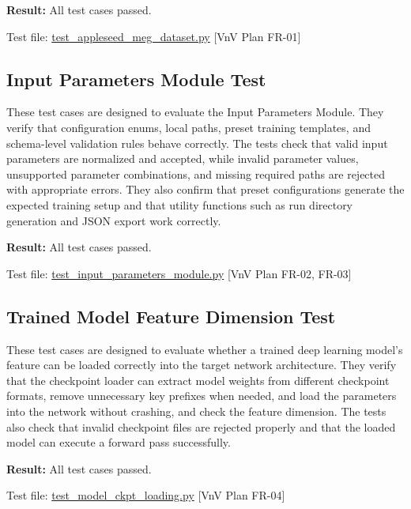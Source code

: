 \documentclass[12pt, titlepage]{article}
\begin{document}
\textbf{Result:} All test cases passed.

Test file: \href{https://github.com/Krozix-2026/cas741-speech-trf/blob/main/src/test/test_appleseed_meg_dataset.py}{test\_appleseed\_meg\_dataset.py} [VnV Plan FR-01]

\subsection{Input Parameters Module Test}

These test cases are designed to evaluate the Input Parameters Module.
They verify that configuration enums, local paths, preset training templates, and schema-level validation rules behave correctly.
The tests check that valid input parameters are normalized and accepted, while invalid parameter values, unsupported parameter combinations, and missing required paths are rejected with appropriate errors.
They also confirm that preset configurations generate the expected training setup and that utility functions such as run directory generation and JSON export work correctly.

\textbf{Result:} All test cases passed.

Test file: \href{https://github.com/Krozix-2026/cas741-speech-trf/blob/main/src/test/test_input_parameters_module.py}{test\_input\_parameters\_module.py} [VnV Plan FR-02, FR-03]

\subsection{Trained Model Feature Dimension Test}

These test cases are designed to evaluate whether a trained deep learning model's feature can be loaded correctly into the target network architecture.
They verify that the checkpoint loader can extract model weights from different checkpoint formats, remove unnecessary key prefixes when needed, and load the parameters into the network without crashing, and check the feature dimension.
The tests also check that invalid checkpoint files are rejected properly and that the loaded model can execute a forward pass successfully.

\textbf{Result:} All test cases passed.

Test file: \href{https://github.com/Krozix-2026/cas741-speech-trf/blob/main/src/test/test_model_ckpt_loading.py}{test\_model\_ckpt\_loading.py} [VnV Plan FR-04]
\end{document}

